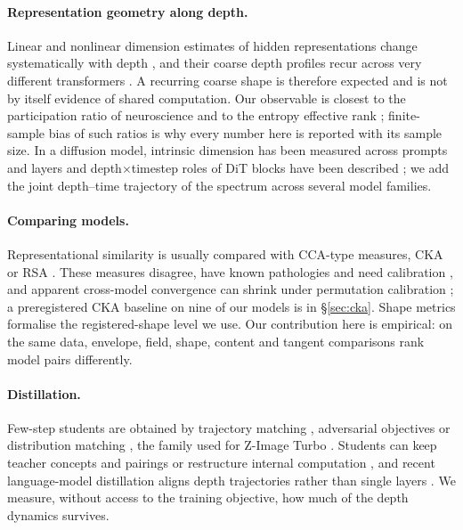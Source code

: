 \documentclass[11pt]{article}
\begin{document}
\paragraph{Representation geometry along depth.} Linear and nonlinear dimension estimates of hidden representations change systematically with depth \citep{ansuini2019intrinsic,recanatesi2019dimensionality}, and their coarse depth profiles recur across very different transformers \citep{valeriani2023geometry,cheng2025emergence,skean2025layer}. A recurring coarse shape is therefore expected and is not by itself evidence of shared computation. Our observable is closest to the participation ratio of neuroscience \citep{gao2017theory,litwinkumar2017optimal} and to the entropy effective rank \citep{roy2007effective,garrido2023rankme}; finite-sample bias of such ratios \citep{chun2026estimating} is why every number here is reported with its sample size. In a diffusion model, intrinsic dimension has been measured across prompts and layers \citep{kvinge2023exploring} and depth$\times$timestep roles of DiT blocks have been described \citep{chen2024deltadit}; we add the joint depth--time trajectory of the spectrum across several model families.

\paragraph{Comparing models.} Representational similarity is usually compared with CCA-type measures, CKA or RSA \citep{raghu2017svcca,morcos2018insights,kornblith2019similarity,kriegeskorte2008representational}. These measures disagree, have known pathologies and need calibration \citep{ding2021grounding,davari2023reliability,cui2022deconfounded,klabunde2025similarity}, and apparent cross-model convergence \citep{huh2024platonic} can shrink under permutation calibration \citep{groger2026revisiting}; a preregistered CKA baseline on nine of our models is in \S\ref{sec:cka}. Shape metrics \citep{williams2021generalized} formalise the registered-shape level we use. Our contribution here is empirical: on the same data, envelope, field, shape, content and tangent comparisons rank model pairs differently.

\paragraph{Distillation.} Few-step students are obtained by trajectory matching \citep{salimans2022progressive,song2023consistency}, adversarial objectives \citep{sauer2024adversarial,sauer2024fast} or distribution matching \citep{yin2024onestep,yin2024improved}, the family used for Z-Image Turbo \citep{liu2025decoupled}. Students can keep teacher concepts and pairings \citep{gandikota2026distilling,surkov2025onestep,li2026why} or restructure internal computation \citep{haskins2025distilled}, and recent language-model distillation aligns depth trajectories rather than single layers \citep{chi2026mta}. We measure, without access to the training objective, how much of the depth dynamics survives.
\end{document}
